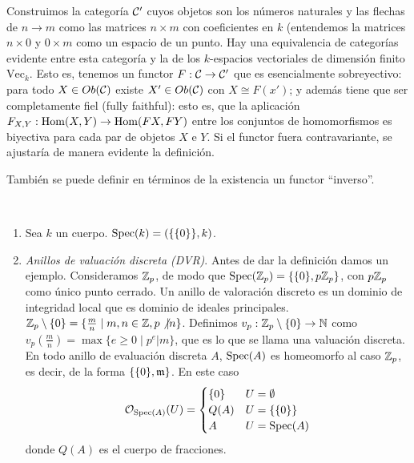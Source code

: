 \documentclass[GA.tex]{subfiles}
\begin{document}
\begin{ej}
Construimos la categoría $\mathcal{C}'$ cuyos objetos son los números naturales y las flechas de $n\to m$ como las matrices $n\times m$ con coeficientes en $k$ (entendemos la matrices $n\times 0$ y $0\times m$ como un espacio de un punto. Hay una equivalencia de categorías evidente entre esta categoría y la de los $k$-espacios vectoriales de dimensión finito $\mathrm{Vec}_k$. Esto es, tenemos un functor $F:\mathcal{C}\to\mathcal{C}'$ que es esencialmente sobreyectivo: para todo $X\in Ob(\mathcal{C})$ existe $X'\in Ob(\mathcal{C})$ con $X\cong F(x')$; y además tiene que ser completamente fiel (fully faithful): esto es, que la aplicación $F_{X,Y}: \operatorname{Hom}(X,Y)\to \operatorname{Hom}(FX,FY)$ entre los conjuntos de homomorfismos es biyectiva para cada par de objetos $X$ e $Y$. Si el functor fuera contravariante, se ajustaría de manera evidente la definición.

También se puede definir en términos de la existencia un functor ``inverso''. 
\end{ej}

\begin{ejs}\
\begin{enumerate}
\item Sea $k$ un cuerpo.  $\operatorname{Spec}(k)=(\{\{0\}\}, k)$. 
\item \emph{Anillos de valuación discreta (DVR)}.  Antes de dar la definición damos un ejemplo. Consideramos $\mathbb{Z}_p$, de modo que $\operatorname{Spec}(\mathbb{Z}_p)=\{\{0\}, p\mathbb{Z}_p\}$, con $p\mathbb{Z}_p$ como único punto cerrado. Un anillo de valoración discreto es un dominio de integridad local que es dominio de ideales principales. $\mathbb{Z}_p\setminus\{0\}=\{\frac{m}{n}\mid m,n\in\mathbb{Z}, p\not| n\}$. Definimos $v_p:\mathbb{Z}_p\setminus\{0\}\to\mathbb{N}$ como $v_p(\frac{m}{n})=\max\{e\geq 0\mid p^e|m\}$, que es lo que se llama una valuación discreta. En todo anillo de evaluación discreta $A$, $\operatorname{Spec}(A)$ es homeomorfo al caso $\mathbb{Z}_p$, es decir, de la forma $\{\{0\},{\mathfrak{m}}\}$. En este caso
\[
{\mathcal O}_{\operatorname{Spec}(A)}(U)=\begin{cases}
\{0\} & U=\emptyset\\
Q(A) & U=\{\{0\}\}\\
A & U=\operatorname{Spec}(A)
\end{cases}
\]
donde $Q(A)$ es el cuerpo de fracciones. 
\end{enumerate}
\end{ejs}
\end{document}
